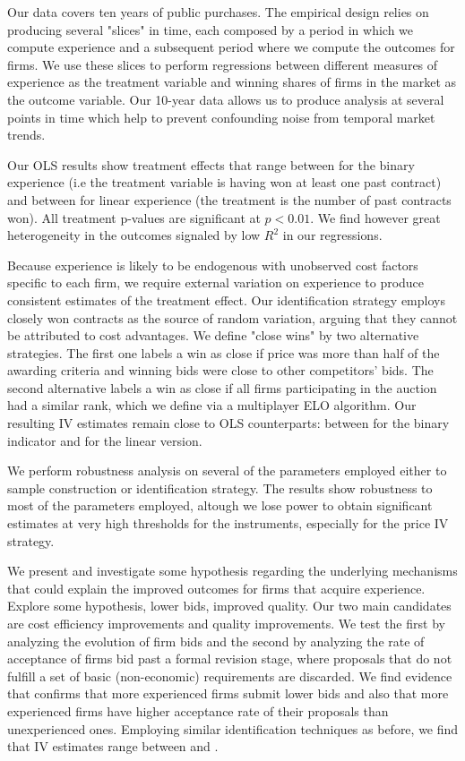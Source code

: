 Our data covers ten years of public purchases. The empirical design relies on producing several "slices" in time, each composed by a period in which we compute experience and a subsequent period where we compute the outcomes for firms. We use these slices to perform regressions between different measures of experience as the treatment variable and winning shares of firms  in the market as the outcome variable. Our 10-year data allows us to produce analysis at several points in time which help to prevent confounding noise from temporal market trends.

Our OLS results show treatment effects that range between for the binary experience (i.e the treatment variable is having won at least one past contract) and between for linear experience (the treatment is the number of past contracts won). All treatment p-values are significant at $p<0.01$. We find however great heterogeneity in the outcomes signaled by low $R^2$ in our regressions.

 Because experience is likely to be endogenous with unobserved cost factors specific to each firm, we require external variation on experience to produce consistent estimates of the treatment effect. Our identification strategy employs closely won contracts as the source of random variation, arguing that they cannot be attributed to cost advantages. We define "close wins" by two alternative strategies. The first one labels a win as close if price was more than half of the awarding criteria and winning bids were close to other competitors' bids. The second alternative labels a win as close if all firms participating in the auction had a similar rank, which we define via a multiplayer ELO algorithm. Our resulting IV estimates remain close to OLS counterparts: between for the binary indicator and for the linear version.

 We perform robustness analysis on several of the parameters employed either to sample construction or identification strategy. The results show robustness to most of the parameters employed, altough we lose power to obtain significant estimates at very high thresholds for the instruments, especially for the price IV strategy.

We present and investigate some hypothesis regarding the underlying mechanisms that could explain the improved outcomes for firms that acquire experience. Explore some hypothesis, lower bids, improved quality. Our two main candidates are cost efficiency improvements and quality improvements. We test the first by analyzing the evolution of firm bids and the second by analyzing the rate of acceptance of firms bid past a formal revision stage, where proposals that do not fulfill a set of basic (non-economic) requirements are discarded. We find evidence that confirms that more experienced firms submit lower bids and also that more experienced firms have higher acceptance rate of their proposals than unexperienced ones. Employing similar identification techniques as before, we find that IV estimates range between  and .


